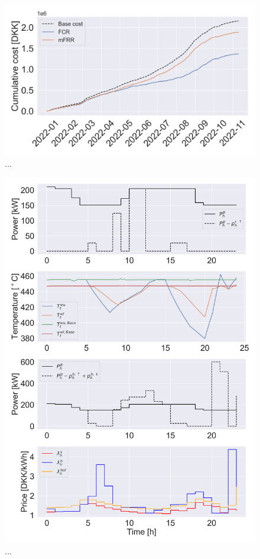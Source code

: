 \documentclass[lettersize,journal]{IEEEtran}
\begin{document}


\begin{figure}[!t]
    \centering
    \includegraphics[width=\columnwidth]{figures/cumulative_cost_comparison.png}
    \caption{...}
    \label{fig:cumulative_cost_comparison}
\end{figure}

\begin{figure}[!t]
    \centering
    \includegraphics[width=\columnwidth]{figures/mfrr_single_case.png}
    \caption{...}
    \label{fig:mfrr_single_case}
\end{figure}
\end{document}
